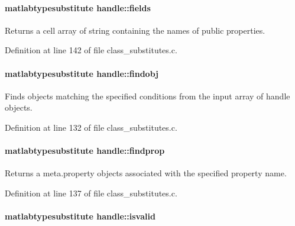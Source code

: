 \paragraph[{\texorpdfstring{fields}{fields}}]{\setlength{\rightskip}{0pt plus 5cm}matlabtypesubstitute handle\+::fields}\hypertarget{classhandle_ad9c0557345e68bd933889c28b2a9484b}{}\label{classhandle_ad9c0557345e68bd933889c28b2a9484b}


Returns a cell array of string containing the names of public properties. 



Definition at line 142 of file class\+\_\+substitutes.\+c.

\paragraph[{\texorpdfstring{findobj}{findobj}}]{\setlength{\rightskip}{0pt plus 5cm}matlabtypesubstitute handle\+::findobj}\hypertarget{classhandle_a000398ac90dd973b4618c739e6fd64a9}{}\label{classhandle_a000398ac90dd973b4618c739e6fd64a9}


Finds objects matching the specified conditions from the input array of handle objects. 



Definition at line 132 of file class\+\_\+substitutes.\+c.

\paragraph[{\texorpdfstring{findprop}{findprop}}]{\setlength{\rightskip}{0pt plus 5cm}matlabtypesubstitute handle\+::findprop}\hypertarget{classhandle_ab4b410e2df940296c9d2563898c951fe}{}\label{classhandle_ab4b410e2df940296c9d2563898c951fe}


Returns a meta.\+property objects associated with the specified property name. 



Definition at line 137 of file class\+\_\+substitutes.\+c.

\paragraph[{\texorpdfstring{isvalid}{isvalid}}]{\setlength{\rightskip}{0pt plus 5cm}matlabtypesubstitute handle\+::isvalid}\hypertarget{classhandle_a72617e83dc9643b61ed8af63e5058ccf}{}\label{classhandle_a72617e83dc9643b61ed8af63e5058ccf}


